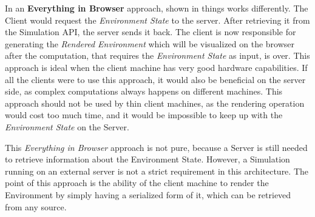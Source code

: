 In an \textbf{Everything in Browser} approach, shown in  things works differently. The Client would request the \textit{Environment State} to the server. After retrieving it from the Simulation API, the server sends it back. The client is now responsible for generating the \textit{Rendered Environment} which will be visualized on the browser after the computation, that requires the \textit{Environment State} as input, is over. This approach is ideal when the client machine has very good hardware capabilities. If all the clients were to use this approach, it would also be beneficial on the server side, as complex computations always happens on different machines. This approach should not be used by thin client machines, as the rendering operation would cost too much time, and it would be impossible to keep up with the \textit{Environment State} on the Server.


\begin{warn}[Note:]
	This \textit{Everything in Browser} approach is not pure, because a Server is still needed to retrieve information about the Environment State. However, a Simulation running on an external server is not a strict requirement in this architecture. The point of this approach is the ability of the client machine to render the Environment by simply having a serialized form of it, which can be retrieved from any source.
\end{warn}
